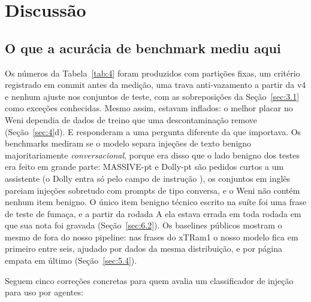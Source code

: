 \documentclass[11pt]{article}
\begin{document}
\section{Discussão}\label{sec:9}

\subsection{O que a acurácia de benchmark mediu aqui}\label{sec:9.1}

Os números da Tabela~\ref{tab:4} foram produzidos com partições fixas, um critério registrado em commit antes da medição, uma trava anti-vazamento a partir da v4 e nenhum ajuste nos conjuntos de teste, com as sobreposições da Seção~\ref{sec:3.1} como exceções conhecidas. Mesmo assim, estavam inflados: o melhor placar no Weni dependia de dados de treino que uma descontaminação remove (Seção~\ref{sec:4}d). E responderam a uma pergunta diferente da que importava. Os benchmarks mediram se o modelo separa injeções de texto benigno majoritariamente \emph{conversacional}, porque era disso que o lado benigno dos testes era feito em grande parte: MASSIVE-pt e Dolly-pt são pedidos curtos a um assistente (o Dolly entra só pelo campo de instrução%
), os conjuntos em inglês pareiam injeções sobretudo com prompts de tipo conversa, e o Weni não contém nenhum item benigno. O único item benigno técnico escrito na suíte foi uma frase de teste de fumaça, e a partir da rodada A ela estava errada em toda rodada em que sua nota foi gravada (Seção~\ref{sec:6.2}). Os baselines públicos mostram o mesmo de fora do nosso pipeline: nas frases do xTRam1 o nosso modelo fica em primeiro entre seis, ajudado por dados da mesma distribuição, e por página empata em último (Seção~\ref{sec:5.4}).

Seguem cinco correções concretas para quem avalia um classificador de injeção para uso por agentes:
\end{document}
